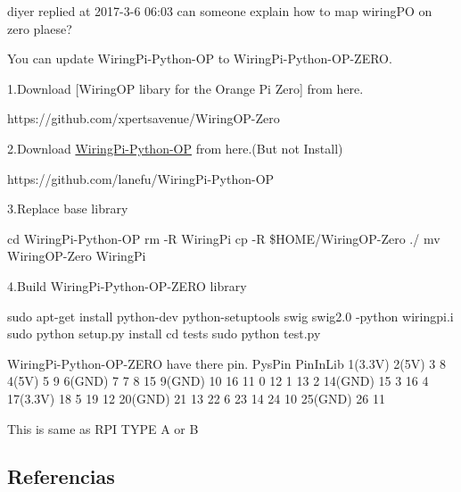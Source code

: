 \documentclass[12pt,spanish,]{scrartcl}
\begin{document}
diyer replied at 2017-3-6 06:03 can someone explain how to map wiringPO
on zero plaese?

You can update WiringPi-Python-OP to WiringPi-Python-OP-ZERO.

1.Download {[}WiringOP libary for the Orange Pi Zero{]} from here.

https://github.com/xpertsavenue/WiringOP-Zero

2.Download \protect\hyperlink{wiringpi-python-op}{WiringPi-Python-OP}
from here.(But not Install)

https://github.com/lanefu/WiringPi-Python-OP

3.Replace base library

cd WiringPi-Python-OP rm -R WiringPi cp -R \$HOME/WiringOP-Zero ./ mv
WiringOP-Zero WiringPi

4.Build WiringPi-Python-OP-ZERO library

sudo apt-get install python-dev python-setuptools swig swig2.0 -python
wiringpi.i sudo python setup.py install cd tests sudo python test.py

WiringPi-Python-OP-ZERO have there pin. PysPin PinInLib 1(3.3V) 2(5V) 3
8 4(5V) 5 9 6(GND) 7 7 8 15 9(GND) 10 16 11 0 12 1 13 2 14(GND) 15 3 16
4 17(3.3V) 18 5 19 12 20(GND) 21 13 22 6 23 14 24 10 25(GND) 26 11

This is same as RPI TYPE A or B

\hypertarget{referencias}{%
\subsection{Referencias}\label{referencias}}
\end{document}
